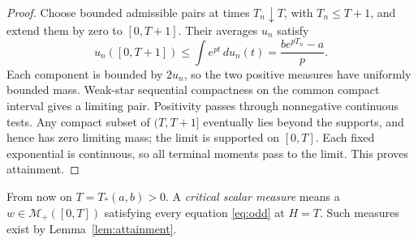 \documentclass[11pt]{article}
\theoremstyle{remark}
\newcommand{\Mplus}{\mathcal M_+}
\begin{document}
\begin{proof}
Choose bounded admissible pairs at times $T_n\downarrow T$, with
$T_n\le T+1$, and extend them by zero to $[0,T+1]$. Their averages $u_n$
satisfy
\[
 u_n([0,T+1])\le\int e^{pt}\,du_n(t)
   =\frac{be^{pT_n}-a}{p}.
\]
Each component is bounded by $2u_n$, so the two positive measures have
uniformly bounded mass. Weak-star sequential compactness on the common
compact interval gives a limiting pair. Positivity passes through
nonnegative continuous tests. Any compact subset of $(T,T+1]$ eventually
lies beyond the supports, and hence has zero limiting mass; the limit is
supported on $[0,T]$. Each fixed exponential is continuous, so all terminal
moments pass to the limit. This proves attainment.
\end{proof}

From now on $T=T_*(a,b)>0$. A \emph{critical scalar measure} means a
$w\in\Mplus([0,T])$ satisfying every equation \eqref{eq:odd} at $H=T$.
Such measures exist by Lemma~\ref{lem:attainment}.
\end{document}
